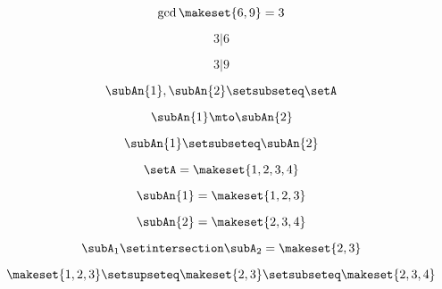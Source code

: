 {\begin{forslides}
        \begin{equation}
            \label{eq:combination-020}
            \gcd \makeset{6, 9 } = 3
        \end{equation}

        \begin{equation}
            \label{eq:combination-021}
            3 | 6
        \end{equation}

        \begin{equation}
            \label{eq:combination-022}
            3 | 9
        \end{equation}

        \begin{equation}
            \label{eq:combination-023}
            \subAn{1}, \subAn{2} \setsubseteq \setA
        \end{equation}

        \begin{equation}
            \label{eq:combination-024}
            \subAn{1} \mto \subAn{2}
        \end{equation}

        \begin{equation}
            \label{eq:combination-025}
            \subAn{1} \setsubseteq \subAn{2}
        \end{equation}

        \begin{equation}
            \label{eq:combination-026}
            \setA = \makeset{ 1, 2, 3, 4 }
        \end{equation}

        \begin{equation}
            \label{eq:combination-027}
            \subAn{1} = \makeset{ 1, 2, 3 }
        \end{equation}

        \begin{equation}
            \label{eq:combination-028}
            \subAn{2} = \makeset{2, 3, 4 }
        \end{equation}

        \begin{equation}
            \label{eq:combination-029}
            \subA_1 \setintersection \subA_2 = \makeset{2, 3 }
        \end{equation}

        \begin{equation}
            \label{eq:combination-030}
            \makeset{ 1, 2, 3 } \setsupseteq \makeset{2, 3 } \setsubseteq \makeset{2, 3, 4 }
        \end{equation}


\end{forslides}}
